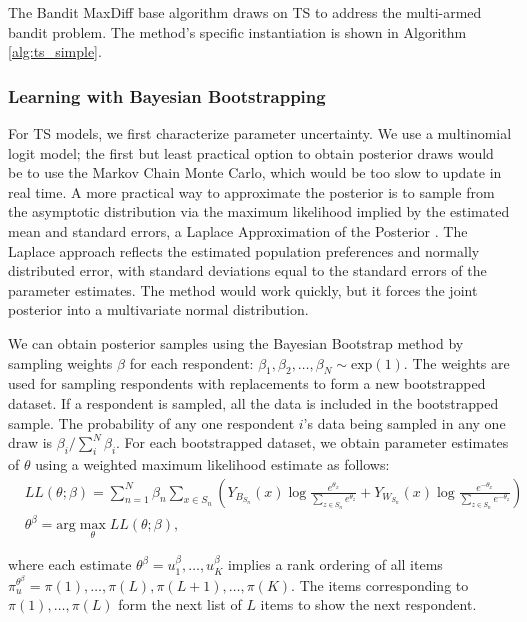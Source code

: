 \documentclass[nonblindrev]{informs3}
\newcommand{\numperset}{L}
\begin{document}
The Bandit MaxDiff base algorithm draws on TS to address the multi-armed bandit problem. The method's specific instantiation is shown in Algorithm \ref{alg:ts_simple}.
  
\subsubsection{Learning with Bayesian Bootstrapping}

For TS models, we first characterize parameter uncertainty. We use a multinomial logit model; the first but least practical option to obtain posterior draws would be to use the Markov Chain Monte Carlo, which would be too slow to update in real time. A more practical way to approximate the posterior is to sample from the asymptotic distribution via the maximum likelihood implied by the estimated mean and standard errors, a Laplace Approximation of the Posterior \citep{tierney1986accurate}. The Laplace approach reflects the estimated population preferences and normally distributed error, with standard deviations equal to the standard errors of the parameter estimates. The method would work quickly, but it forces the joint posterior into a multivariate normal distribution. 

We can obtain posterior samples using the Bayesian Bootstrap method by sampling weights $\beta$ for each respondent: $\beta_1,\beta_2,\ldots,\beta_N \sim \text{exp}(1)$. The weights are used for sampling respondents with replacements to form a new bootstrapped dataset. If a respondent is sampled, all the data is included in the bootstrapped sample. The probability of any one respondent $i$'s data being sampled in any one draw is $\beta_i / \sum_{i}^{N}\beta_i$.  For each bootstrapped dataset, we obtain parameter estimates of $\theta$ using a weighted  maximum likelihood estimate as follows:
\begin{align}
&LL(\theta;\beta)=\sum_{n=1}^N \beta_n
\sum_{x \in S_n} 
	\left(
		Y_{B_{S_n}}(x)
		\log{\frac{e^{\theta_x}}{\sum_{z\in S_n} e^{\theta_z}}} 
		+ 
		Y_{W_{S_n}}(x)
		\log{\frac{e^{-\theta_x}}{\sum_{z\in S_n} e^{-\theta_z}}}
	\right) \\
&\theta^\beta = \text{arg}\max_{\theta} LL(\theta;\beta) ,
\end{align}

where each estimate $\theta^\beta = u_1^\beta, \ldots, u_K^\beta$ implies a rank ordering of all items $\pi_{u}^{\theta^\beta} = \pi(1),\ldots,\pi(\numperset),\pi(\numperset+1),\ldots,\pi(K)$. The items corresponding to $\pi(1),\ldots,\pi(\numperset)$ form the next list of $\numperset$ items to show the next respondent. 
\end{document}
